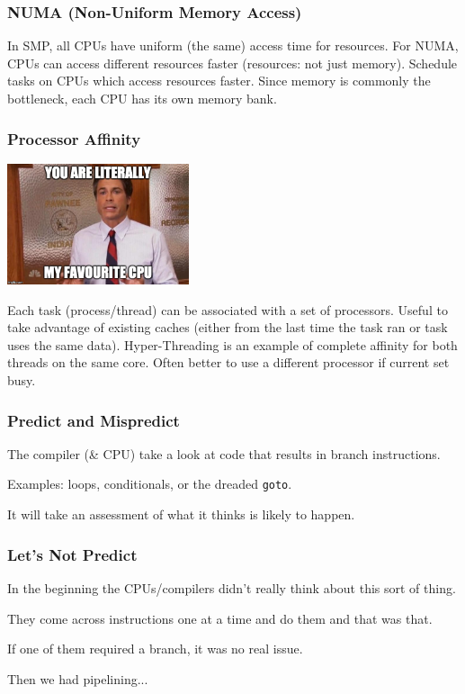 \begin{frame}
  \frametitle{NUMA (Non-Uniform Memory Access)}


    In SMP, all CPUs have uniform (the same) access time for resources.
    \vfill
    For NUMA, CPUs can access different resources faster (resources: not just
          memory).
    \vfill
    Schedule tasks on CPUs which access resources faster.
    \vfill
    Since memory is commonly the bottleneck, each CPU has its own memory
          bank.

\end{frame}

\begin{frame}
  \frametitle{Processor Affinity}

\begin{center}
	\includegraphics[width=0.4\textwidth]{images/traeger.jpg}
\end{center}

    Each task (process/thread) can be associated with a set of processors.
    \vfill
    Useful to take advantage of existing caches (either from the last time
          the task ran or task uses the same data).
    \vfill
    Hyper-Threading is an example of complete affinity for both threads on
          the same core.
    \vfill
    Often better to use a different processor if current set busy.

\end{frame}



\begin{frame}
\frametitle{Predict and Mispredict}
The compiler (\& CPU) take a look at code that results in branch instructions.

Examples: loops, conditionals, or the dreaded \texttt{goto}.

It will take an assessment of what it thinks is likely to happen. 

\end{frame}



\begin{frame}
\frametitle{Let's Not Predict}

In the beginning the CPUs/compilers didn't really think about this sort of thing.

They come across instructions one at a time and do them and that was that. 

If one of them required a branch, it was no real issue. 

Then we had pipelining...
\end{frame}



